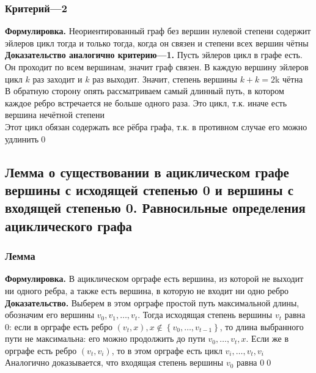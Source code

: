 \documentclass[a4paper]{article}
\begin{document}
\subsubsection*{Критерий—2}
\textbf{Формулировка.} Неориентированный граф без вершин нулевой степени содержит эйлеров цикл тогда и только тогда, когда он связен и степени всех вершин чётны\\[2mm]
\textbf{Доказательство аналогично критерию—1.} Пусть эйлеров цикл в графе есть. Он проходит по всем вершинам, значит граф связен. В каждую вершину эйлеров цикл $k$ раз заходит и $k$ раз выходит. Значит, степень вершины $k + k = 2$k чётна\\[2mm]
В обратную сторону опять рассматриваем самый длинный путь, в котором каждое ребро встречается не больше одного раза. Это цикл, т.к. иначе есть вершина нечётной степени\\
Этот цикл обязан содержать все рёбра графа, т.к. в противном случае его можно удлинить\qed

\subsection{Лемма о существовании в ациклическом графе вершины с исходящей степенью 0 и вершины с входящей степенью 0. Равносильные определения ациклического графа}
\subsubsection*{Лемма}
\textbf{Формулировка.} В ациклическом орграфе есть вершина, из которой не выходит ни одного ребра, а также есть вершина, в которую не входит ни одно ребро\\[2mm]
\textbf{Доказательство.} Выберем в этом орграфе простой путь максимальной длины, обозначим его вершины $v_0, v_1, \ldots, v_t$. Тогда исходящая степень вершины $v_t$ равна 0: если в орграфе есть ребро $\left(v_t, x\right), x \notin\left\{v_0, \ldots, v_{t-1}\right\}$, то длина выбранного пути не максимальна: его можно продолжить до пути $v_0, \ldots, v_t, x$. Если же в орграфе есть ребро $\left(v_t, v_i\right)$, то в этом орграфе есть цикл $v_i, \ldots, v_t, v_i$\\[2mm]
Аналогично доказывается, что входящая степень вершины $v_0$ равна 0\qed
\end{document}
